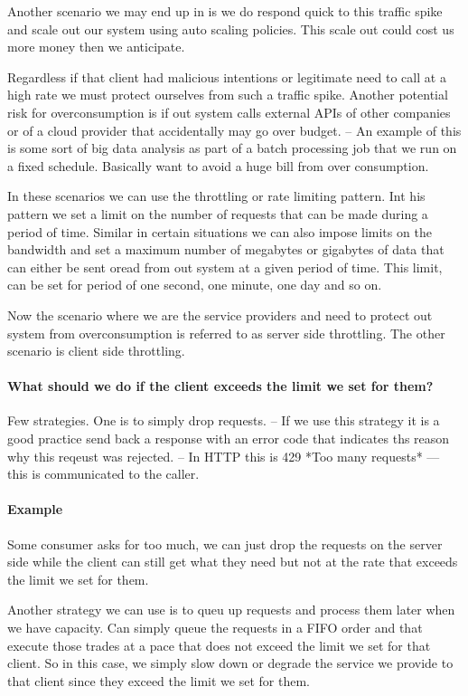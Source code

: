 \documentclass[a4paper, 11pt]{book}
\begin{document}
    Another scenario we may end up in is we do respond quick to this traffic spike and scale out our system using auto scaling policies.
    This scale out could cost us more money then we anticipate.

    Regardless if that client had malicious intentions or legitimate need to call at a high rate we must protect ourselves from such a traffic spike.
    Another potential risk for overconsumption is if out system calls external APIs of other companies or of a cloud provider that accidentally may go over budget.
    -- An example of this is some sort of big data analysis as part of a batch processing job that we run on a fixed schedule.
    Basically want to avoid a huge bill from over consumption.

    In these scenarios we can use the throttling or rate limiting pattern.
    Int his pattern we set a limit on the number of requests that can be made during a period of time.
    Similar in certain situations we can also impose limits on the bandwidth and set a maximum number of megabytes or gigabytes of data that can either be sent oread from out system at a given period of time.
    This limit, can be set for period of one second, one minute, one day and so on.

    Now the scenario where we are the service providers and need to protect out system from overconsumption is referred to as server side throttling.
    The other scenario is client side throttling.

    \paragraph{What should we do if the client exceeds the limit we set for them?}
    Few strategies.
    One is to simply drop requests.
    -- If we use this strategy it is a good practice send back a response with an error code that indicates ths reason why this reqeust was rejected.
    -- In HTTP this is 429 *Too many requests* --- this is communicated to the caller.

    \paragraph{Example}
    Some consumer asks for too much, we can just drop the requests on the server side while the client can still get what they need but not at the rate that exceeds the limit we set for them.

    Another strategy we can use is to queu up requests and process them later when we have capacity.
    Can simply queue the requests in a FIFO order and that execute those trades at a pace that does not exceed the limit we set for that client.
    So in this case, we simply slow down or degrade the service we provide to that client since they exceed the limit we set for them.
\end{document}
